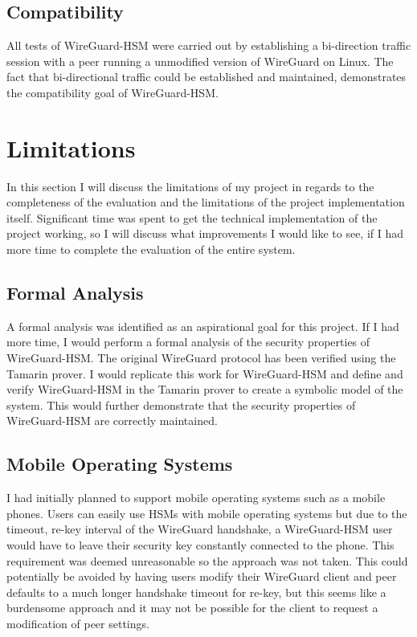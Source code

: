 \documentclass [11pt, proquest] {uwthesis}[2020/02/24]
\begin{document}
\subsection{Compatibility}
All tests of WireGuard-HSM were carried out by establishing a bi-direction traffic session with a peer running a unmodified version of WireGuard on Linux. The fact that bi-directional traffic could be established and maintained, demonstrates the compatibility goal of WireGuard-HSM. 

\section {Limitations}
In this section I will discuss the limitations of my project in regards to the completeness of the evaluation and the limitations of the project implementation itself. Significant time was spent to get the technical implementation of the project working, so I will discuss what improvements I would like to see, if I had more time to complete the evaluation of the entire system.

\subsection{Formal Analysis}
A formal analysis was identified as an aspirational goal for this project. If I had more time, I would perform a formal analysis of the security properties of WireGuard-HSM. The original WireGuard protocol has been verified using the Tamarin prover\cite{donenfeld_formal_2018}. I would replicate this work for WireGuard-HSM and define and verify WireGuard-HSM in the Tamarin prover to create a symbolic model of the system. This would further demonstrate that the security properties of WireGuard-HSM are correctly maintained.

\subsection{Mobile Operating Systems}
I had initially planned to support mobile operating systems such as a mobile phones. Users can easily use HSMs with mobile operating systems but due to the timeout, re-key interval of the WireGuard handshake, a WireGuard-HSM user would have to leave their security key constantly connected to the phone. This requirement was deemed unreasonable so the approach was not taken. This could potentially be avoided by having users modify their WireGuard client and peer defaults to a much longer handshake timeout for re-key, but this seems like a burdensome approach and it may not be possible for the client to request a modification of peer settings.
\end{document}
